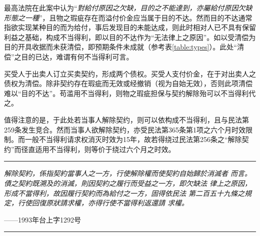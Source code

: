 \documentclass[UTF-8]{ctexrep}
\newcommand{\article}[1]{民法第#1条}
\newcommand{\articlesub}[2]{民法第#1条第#2项}
\newcommand{\quot}[1]{“\emph{#1}”}
\newcommand{\cas}[2]{#1年台上字#2号}
\newcommand{\prov}[2]{\par\noindent\rule{\textwidth}{1pt}\par {\itshape #1}\par\mbox{}\hfill——#2\par\noindent\rule{\textwidth}{1pt}}
\begin{document}
  \par
  \label{par:defect}
  最高法院在此案中认为\quot{對給付原因之欠缺，目的之不能達到，亦屬給付原因欠缺形態之一種}，且物之瑕疵存在而溢付价金应当属于目的不达。然而目的不达通常指欲实现某种目的而为给付，事后发现目的未能达成，则此时相对人已不具有保留利益之基础，构成不当得利，即以目的不达作为“无法律上之原因”。如以受清偿为目的开具收据而未获清偿，即预期条件未成就（参考表\ref{table:types}）。此处“清偿”之目的已达，难谓有何不当得利可言。
  \par
  买受人于出卖人订立买卖契约，形成两个债权。买受人支付价金，在于对出卖人之债权为清偿。除非契约存在瑕疵而无效或经撤销（视为自始无效），否则此项清偿难以“目的不达”。苟滥用不当得利，则物之瑕疵担保与契约解除殆可以不当得利代之。
  \par
  值得注意的是，于此处若当事人解除契约，则可以依构成不当得利，且与\article{259}发生竞合。然而当事人欲解除契约，亦受\articlesub{365}{1}之六个月时效限制。而一般不当得利请求权消灭时效为15年，故若得绕过\article{256}之“解除契约”而径直适用不当得利，则等价于绕过六个月之时效。
  \prov{解除契約，係指契約當事人之一方，行使解除權而使契約自始歸於消滅者
而言。債之契約既溯及的消滅，則因契約之履行而受益之一方，即欠缺法
律上之原因，形成不當得利，故因履行契約而為給付之一方，固得依民法
第二百五十九條之規定，行使回復原狀請求權，亦得行使不當得利返還請
求權。}{\cas{1993}{1292}}
\end{document}
